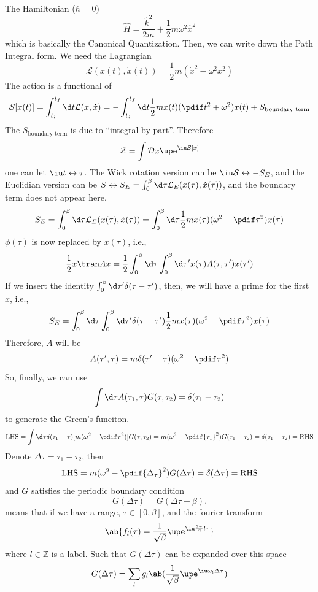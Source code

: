 The Hamiltonian ($\hbar = 0$)
\[
  \hat H = \frac{\hat k^2}{2m} + \frac12m\omega^2\hat x^2
\]
which is basically the Canonical Quantization.
Then, we can write down the Path Integral form. We need the Lagrangian
\[
  \mathcal L(x(t), \dot x(t)) = \frac12 m(\dot x^2 - \omega^2x^2)
\]
The action is a functional of
\[
  \mathcal S[x(t)] = \int_{t_i}^{t_f} \d t \mathcal L(x, \dot x)
= -\int_{t_i}^{t_f} \d t \frac12mx(t) (\pdif t^2 + \omega^2) x(t)
  +S_\text{boundary term}
\]
The $S_\text{boundary term}$ is due to ``integral by part''.
Therefore
\[
  \mathcal Z = \int \mathcal D x\upe^{\iu\mathcal S[x]}
\]
one can let $\iu t \leftrightarrow \tau$.
The Wick rotation version can be $\iu\mathcal S \leftrightarrow -S_E$,
and the Euclidian version can be
$S \leftrightarrow S_E = \int_0^\beta \d\tau \mathcal L_E(x(\tau), \dot x(\tau))$,
and the boundary term does not appear here.
\[
  S_E = \int_0^\beta \d\tau \mathcal L_E(x(\tau), \dot x(\tau))
= \int_0^\beta \d\tau \frac12 mx(\tau) (\omega^2 - \pdif\tau^2) x(\tau)
\]
$\phi(\tau)$ is now replaced by $x(\tau)$, i.e.,
\[
  \frac12 x\tran A x = \frac12 \int_0^\beta \d\tau \int_0^\beta\d\tau'
  x(\tau) A(\tau,\tau') x(\tau')
\]
If we insert the identity $\int_0^\beta\d\tau' \delta(\tau - \tau')$,
then, we will have a prime for the first $x$, i.e.,
\[
  S_E = \int_0^\beta \d\tau \int_0^\beta \d\tau' \delta(\tau - \tau')
        \frac12 mx(\tau) (\omega^2 - \pdif\tau^2) x(\tau)
\]
Therefore, $A$ will be
\[
  A(\tau', \tau) = m\delta(\tau' - \tau) (\omega^2 - \pdif\tau^2)
\]
So, finally, we can use
\begin{equation}
  \int \d\tau A(\tau_1, \tau) G(\tau, \tau_2) = \delta(\tau_1 - \tau_2)
\end{equation}
to generate the Green's funciton.
\[
  \text{LHS} = \int \d\tau \delta(\tau_1 - \tau)
               [m(\omega^2 - \pdif \tau^2)] G(\tau, \tau_2)
= m(\omega^2 - \pdif{\tau_1}^2) G(\tau_1 - \tau_2)
= \delta(\tau_1 - \tau_2) = \text{RHS}
\]
Denote $\Delta\tau = \tau_1 - \tau_2$, then
\[
  \text{LHS} = m(\omega^2 - \pdif{\Delta_\tau}^2) G(\Delta\tau)
= \delta(\Delta\tau) = \text{RHS}
\]
and $G$ satisfies the periodic boundary condition
\[
  G(\Delta\tau) = G(\Delta\tau + \beta).
\]
means that if we have a range, $\tau \in [0, \beta]$,
and the fourier transform
\[
  \ab\{f_l(\tau) = \frac1{\sqrt\beta} \upe^{\iu\frac{2\pi}{\beta} l\tau}\}
\]
where $l \in \mathbb Z$ is a label.
Such that $G(\Delta\tau)$ can be expanded over this space
\begin{equation}
  G(\Delta\tau)
= \sum_l g_l \ab(\frac1{\sqrt\beta} \upe^{\iu\omega_l\Delta\tau})
\end{equation}
